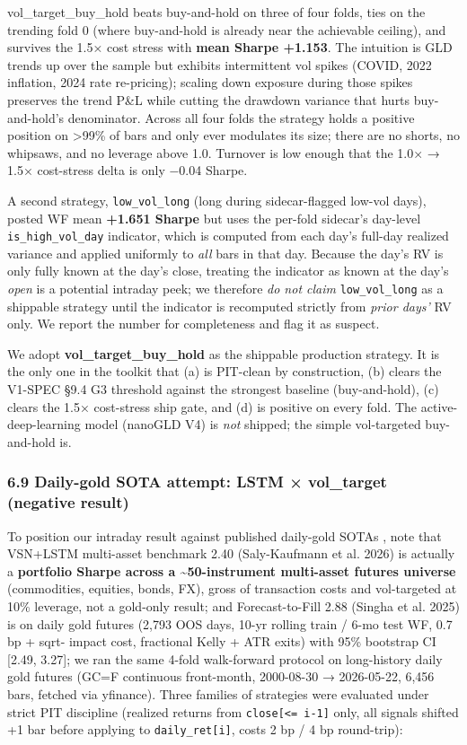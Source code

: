 \documentclass[
]{article}
\begin{document}
vol\_target\_buy\_hold beats buy-and-hold on three of four folds, ties
on the trending fold 0 (where buy-and-hold is already near the
achievable ceiling), and survives the 1.5× cost stress with \textbf{mean
Sharpe +1.153}. The intuition is GLD trends up over the sample but
exhibits intermittent vol spikes (COVID, 2022 inflation, 2024 rate
re-pricing); scaling down exposure during those spikes preserves the
trend P\&L while cutting the drawdown variance that hurts buy-and-hold's
denominator. Across all four folds the strategy holds a positive
position on \textgreater99\% of bars and only ever modulates its size;
there are no shorts, no whipsaws, and no leverage above 1.0. Turnover is
low enough that the 1.0× → 1.5× cost-stress delta is only −0.04 Sharpe.

A second strategy, \texttt{low\_vol\_long} (long during sidecar-flagged
low-vol days), posted WF mean \textbf{+1.651 Sharpe} but uses the
per-fold sidecar's day-level \texttt{is\_high\_vol\_day} indicator,
which is computed from each day's full-day realized variance and applied
uniformly to \emph{all} bars in that day. Because the day's RV is only
fully known at the day's close, treating the indicator as known at the
day's \emph{open} is a potential intraday peek; we therefore \emph{do
not claim} \texttt{low\_vol\_long} as a shippable strategy until the
indicator is recomputed strictly from \emph{prior days'} RV only. We
report the number for completeness and flag it as suspect.

We adopt \textbf{vol\_target\_buy\_hold} as the shippable production
strategy. It is the only one in the toolkit that (a) is PIT-clean by
construction, (b) clears the V1-SPEC §9.4 G3 threshold against the
strongest baseline (buy-and-hold), (c) clears the 1.5× cost-stress ship
gate, and (d) is positive on every fold. The active-deep-learning model
(nanoGLD V4) is \emph{not} shipped; the simple vol-targeted buy-and-hold
is.

\subsubsection{6.9 Daily-gold SOTA attempt: LSTM × vol\_target (negative
result)}\label{daily-gold-sota-attempt-lstm-vol_target-negative-result}

To position our intraday result against published daily-gold SOTAs ,
note that VSN+LSTM multi-asset benchmark 2.40 (Saly-Kaufmann et al.
2026) is actually a \textbf{portfolio Sharpe across a
\textasciitilde50-instrument multi-asset futures universe} (commodities,
equities, bonds, FX), gross of transaction costs and vol-targeted at
10\% leverage, not a gold-only result; and Forecast-to-Fill 2.88 (Singha
et al. 2025) is on daily gold futures (2,793 OOS days, 10-yr rolling
train / 6-mo test WF, 0.7 bp + sqrt- impact cost, fractional Kelly + ATR
exits) with 95\% bootstrap CI {[}2.49, 3.27{]}; we ran the same 4-fold
walk-forward protocol on long-history daily gold futures (GC=F
continuous front-month, 2000-08-30 → 2026-05-22, 6,456 bars, fetched via
yfinance). Three families of strategies were evaluated under strict PIT
discipline (realized returns from \texttt{close{[}\textless{}=\ i-1{]}}
only, all signals shifted +1 bar before applying to
\texttt{daily\_ret{[}i{]}}, costs 2 bp / 4 bp round-trip):
\end{document}
